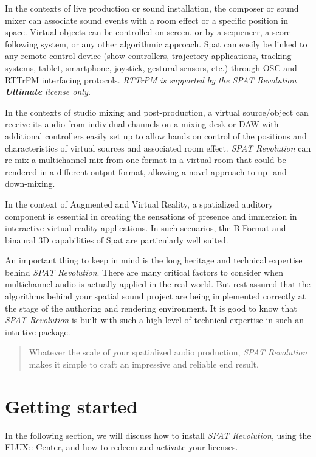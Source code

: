 \documentclass[
  letterpaper,
  DIV=11,
  numbers=noendperiod]{scrreport}
\begin{document}
In the contexts of live production or sound installation, the composer
or sound mixer can associate sound events with a room effect or a
specific position in space. Virtual objects can be controlled on screen,
or by a sequencer, a score-following system, or any other algorithmic
approach. Spat can easily be linked to any remote control device (show
controllers, trajectory applications, tracking systems, tablet,
smartphone, joystick, gestural sensors, etc.) through OSC and RTTrPM
interfacing protocols. \emph{RTTrPM is supported by the \emph{SPAT
Revolution} \textbf{Ultimate} license only.}

In the contexts of studio mixing and post-production, a virtual
source/object can receive its audio from individual channels on a mixing
desk or DAW with additional controllers easily set up to allow hands on
control of the positions and characteristics of virtual sources and
associated room effect. \emph{SPAT Revolution} can re-mix a multichannel
mix from one format in a virtual room that could be rendered in a
different output format, allowing a novel approach to up- and
down-mixing.

In the context of Augmented and Virtual Reality, a spatialized auditory
component is essential in creating the sensations of presence and
immersion in interactive virtual reality applications. In such
scenarios, the B-Format and binaural 3D capabilities of Spat are
particularly well suited.

An important thing to keep in mind is the long heritage and technical
expertise behind \emph{SPAT Revolution}. There are many critical factors
to consider when multichannel audio is actually applied in the real
world. But rest assured that the algorithms behind your spatial sound
project are being implemented correctly at the stage of the authoring
and rendering environment. It is good to know that \emph{SPAT
Revolution} is built with such a high level of technical expertise in
such an intuitive package.

\begin{quote}
Whatever the scale of your spatialized audio production, \emph{SPAT
Revolution} makes it simple to craft an impressive and reliable end
result.
\end{quote}

\part{Getting started}

In the following section, we will discuss how to install \emph{SPAT
Revolution}, using the FLUX:: Center, and how to redeem and activate
your licenses.
\end{document}
